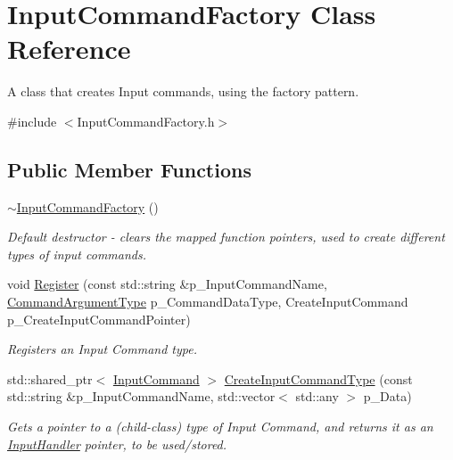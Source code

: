\hypertarget{class_input_command_factory}{}\section{Input\+Command\+Factory Class Reference}
\label{class_input_command_factory}


A class that creates Input commands, using the factory pattern.  




{\ttfamily \#include $<$Input\+Command\+Factory.\+h$>$}

\subsection*{Public Member Functions}
\begin{DoxyCompactItemize}
\item 
\mbox{\label{class_input_command_factory_a428df8e7da41f132aaabcebf49223b1b}} 
\mbox{\hyperlink{class_input_command_factory_a428df8e7da41f132aaabcebf49223b1b}{$\sim$\+Input\+Command\+Factory}} ()
\begin{DoxyCompactList}\small\item\em Default destructor -\/ clears the mapped function pointers, used to create different types of input commands. \end{DoxyCompactList}\item 
void \mbox{\hyperlink{class_input_command_factory_ac6ad25b227908980300cd094d1396834}{Register}} (const std\+::string \&p\+\_\+\+Input\+Command\+Name, \mbox{\hyperlink{_command_argument_types_8h_adefdc85c4f4f8765e96fd2f0d78b133e}{Command\+Argument\+Type}} p\+\_\+\+Command\+Data\+Type, Create\+Input\+Command p\+\_\+\+Create\+Input\+Command\+Pointer)
\begin{DoxyCompactList}\small\item\em Registers an Input Command type. \end{DoxyCompactList}\item 
std\+::shared\+\_\+ptr$<$ \mbox{\hyperlink{class_input_command}{Input\+Command}} $>$ \mbox{\hyperlink{class_input_command_factory_a4ea90122e946a301e8b645a656170ea4}{Create\+Input\+Command\+Type}} (const std\+::string \&p\+\_\+\+Input\+Command\+Name, std\+::vector$<$ std\+::any $>$ p\+\_\+\+Data)
\begin{DoxyCompactList}\small\item\em Gets a pointer to a (child-\/class) type of Input Command, and returns it as an \mbox{\hyperlink{class_input_handler}{Input\+Handler}} pointer, to be used/stored. \end{DoxyCompactList}\item 

\end{DoxyCompactItemize}
